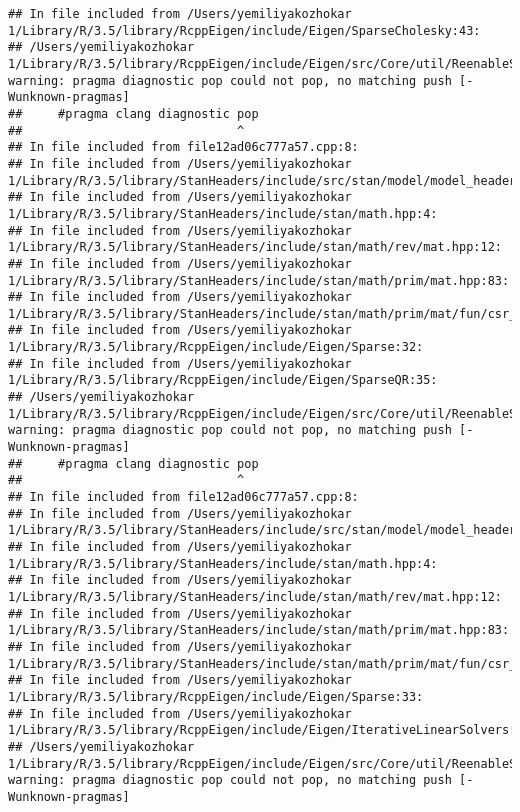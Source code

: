 \documentclass[]{article}
\begin{document}
\begin{verbatim}
## In file included from /Users/yemiliyakozhokar 1/Library/R/3.5/library/RcppEigen/include/Eigen/SparseCholesky:43:
## /Users/yemiliyakozhokar 1/Library/R/3.5/library/RcppEigen/include/Eigen/src/Core/util/ReenableStupidWarnings.h:10:30: warning: pragma diagnostic pop could not pop, no matching push [-Wunknown-pragmas]
##     #pragma clang diagnostic pop
##                              ^
## In file included from file12ad06c777a57.cpp:8:
## In file included from /Users/yemiliyakozhokar 1/Library/R/3.5/library/StanHeaders/include/src/stan/model/model_header.hpp:4:
## In file included from /Users/yemiliyakozhokar 1/Library/R/3.5/library/StanHeaders/include/stan/math.hpp:4:
## In file included from /Users/yemiliyakozhokar 1/Library/R/3.5/library/StanHeaders/include/stan/math/rev/mat.hpp:12:
## In file included from /Users/yemiliyakozhokar 1/Library/R/3.5/library/StanHeaders/include/stan/math/prim/mat.hpp:83:
## In file included from /Users/yemiliyakozhokar 1/Library/R/3.5/library/StanHeaders/include/stan/math/prim/mat/fun/csr_extract_u.hpp:6:
## In file included from /Users/yemiliyakozhokar 1/Library/R/3.5/library/RcppEigen/include/Eigen/Sparse:32:
## In file included from /Users/yemiliyakozhokar 1/Library/R/3.5/library/RcppEigen/include/Eigen/SparseQR:35:
## /Users/yemiliyakozhokar 1/Library/R/3.5/library/RcppEigen/include/Eigen/src/Core/util/ReenableStupidWarnings.h:10:30: warning: pragma diagnostic pop could not pop, no matching push [-Wunknown-pragmas]
##     #pragma clang diagnostic pop
##                              ^
## In file included from file12ad06c777a57.cpp:8:
## In file included from /Users/yemiliyakozhokar 1/Library/R/3.5/library/StanHeaders/include/src/stan/model/model_header.hpp:4:
## In file included from /Users/yemiliyakozhokar 1/Library/R/3.5/library/StanHeaders/include/stan/math.hpp:4:
## In file included from /Users/yemiliyakozhokar 1/Library/R/3.5/library/StanHeaders/include/stan/math/rev/mat.hpp:12:
## In file included from /Users/yemiliyakozhokar 1/Library/R/3.5/library/StanHeaders/include/stan/math/prim/mat.hpp:83:
## In file included from /Users/yemiliyakozhokar 1/Library/R/3.5/library/StanHeaders/include/stan/math/prim/mat/fun/csr_extract_u.hpp:6:
## In file included from /Users/yemiliyakozhokar 1/Library/R/3.5/library/RcppEigen/include/Eigen/Sparse:33:
## In file included from /Users/yemiliyakozhokar 1/Library/R/3.5/library/RcppEigen/include/Eigen/IterativeLinearSolvers:46:
## /Users/yemiliyakozhokar 1/Library/R/3.5/library/RcppEigen/include/Eigen/src/Core/util/ReenableStupidWarnings.h:10:30: warning: pragma diagnostic pop could not pop, no matching push [-Wunknown-pragmas]

\end{verbatim}
\end{document}
